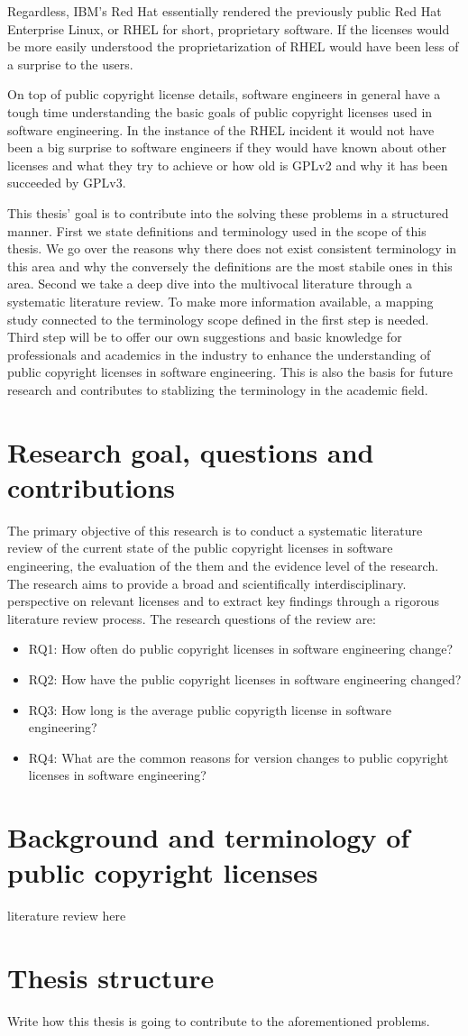 Regardless, IBM's Red Hat essentially rendered the previously public Red Hat Enterprise Linux, or RHEL for short, proprietary software. If the licenses would be more easily understood the proprietarization of RHEL would have been less of a surprise to the users.

On top of public copyright license details, software engineers in general have a tough time understanding the basic goals of public copyright licenses used in software engineering. In the instance of the RHEL incident it would not have been a big surprise to software engineers if they would have known about other licenses and what they try to achieve or how old is GPLv2 and why it has been succeeded by GPLv3.

This thesis' goal is to contribute into the solving these problems in a structured manner. First we state definitions and terminology used in the scope of this thesis. We go over the reasons why there does not exist consistent terminology in this area and why the conversely the definitions are the most stabile ones in this area. Second we take a deep dive into the multivocal literature through a systematic literature review. To make more information available, a mapping study connected to the terminology scope defined in the first step is needed. Third step will be to offer our own suggestions and basic knowledge for professionals and academics in the industry to enhance the understanding of public copyright licenses in software engineering. This is also the basis for future research and contributes to stablizing the terminology in the academic field.

\section{Research goal, questions and contributions}
The primary objective of this research is to conduct a systematic literature review of the current state of the public copyright licenses in software engineering, the evaluation of the them and the evidence level of the research. The research aims to provide a broad and scientifically interdisciplinary. perspective on relevant licenses and to extract key findings through a rigorous literature review process. The research questions of the review are:
\begin{itemize}
	\item RQ1: How often do public copyright licenses in software engineering change?
	\item RQ2: How have the public copyright licenses in software engineering changed?
	\item RQ3: How long is the average public copyrigth license in software engineering?
	\item RQ4: What are the common reasons for version changes to public copyright licenses in software engineering?
\end{itemize}

\section{Background and terminology of public copyright licenses}
literature review here

\section{Thesis structure}

Write how this thesis is going to contribute to the aforementioned problems.
